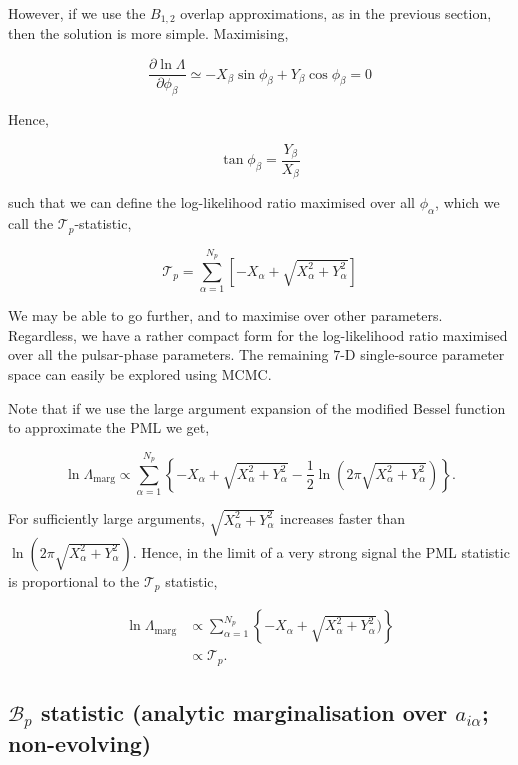 \documentclass[prd,showpacs,nofootinbib]{revtex4}
\begin{document}
However, if we use the $B_{1,2}$ overlap approximations, as in the previous section, then the solution is more simple. Maximising,

\begin{equation}
\frac{\partial\ln\Lambda}{\partial\phi_{\beta}} \simeq -X_{\beta}\sin\phi_{\beta} + Y_{\beta}\cos\phi_{\beta}=0
\end{equation}

Hence,

\begin{equation}
\tan\phi_{\beta}=\frac{Y_{\beta}}{X_{\beta}}
\end{equation}

such that we can define the log-likelihood ratio maximised over all $\phi_{\alpha}$, which we call the $\mathcal{T}_p$-statistic,

\begin{equation}
\mathcal{T}_p = \sum_{\alpha=1}^{N_p}\left[-X_{\alpha} + \sqrt{X_{\alpha}^2+Y_{\alpha}^2}\right]
\end{equation}

We may be able to go further, and to maximise over other parameters. Regardless, we have a rather compact form for the log-likelihood ratio maximised over all the pulsar-phase parameters. The remaining $7$-D single-source parameter space can easily be explored using MCMC.

Note that if we use the large argument expansion of the modified Bessel function to approximate the PML we get,

\begin{equation}
\ln\Lambda_{\text{marg}} \propto \sum_{\alpha=1}^{N_p}\left\{-X_{\alpha} + \sqrt{X_{\alpha}^2+Y_{\alpha}^2}-\frac{1}{2}\ln\left(2\pi\sqrt{X_{\alpha}^2+Y_{\alpha}^2}\right)\right\}.
\end{equation}

For sufficiently large arguments, $\sqrt{X_{\alpha}^2+Y_{\alpha}^2}$ increases faster than $\ln\left(2\pi\sqrt{X_{\alpha}^2+Y_{\alpha}^2}\right)$. Hence, in the limit of a very strong signal the PML statistic is proportional to the $\mathcal{T}_p$ statistic,

\begin{align}
\ln\Lambda_{\text{marg}} &\propto \sum_{\alpha=1}^{N_p}\left\{-X_{\alpha} + \sqrt{X_{\alpha}^2+Y_{\alpha}^2})\right\} \nonumber\\
&\propto\mathcal{T}_p.
\end{align}


\subsection{$\mathcal{B}_p$ statistic (analytic marginalisation over $a_{i\alpha}$; non-evolving)}
\end{document}
